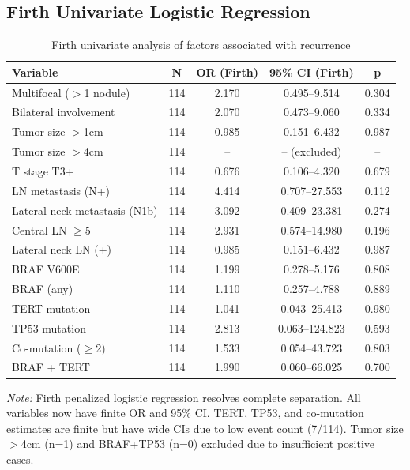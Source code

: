 \documentclass[12pt,a4paper]{article}
\begin{document}
\subsection{Firth Univariate Logistic Regression}
\begin{table}[H]
\centering
\caption{Firth univariate analysis of factors associated with recurrence}
\label{tab:uni}
\begin{tabular}{lcccc}
\toprule
Variable & N & OR (Firth) & 95\% CI (Firth) & p \\
\midrule
Multifocal ($>$1 nodule)           & 114 & 2.170 & 0.495--9.514   & 0.304 \\
Bilateral involvement         & 114 & 2.070 & 0.473--9.060   & 0.334 \\
Tumor size $>$1cm        & 114 & 0.985 & 0.151--6.432   & 0.987 \\
Tumor size $>$4cm        & 114 & --    & -- (excluded)   & --   \\
T stage T3+              & 114 & 0.676 & 0.106--4.320   & 0.679 \\
LN metastasis (N+)           & 114 & 4.414 & 0.707--27.553  & 0.112 \\
Lateral neck metastasis (N1b)  & 114 & 3.092 & 0.409--23.381  & 0.274 \\
Central LN $\geq$5    & 114 & 2.931 & 0.574--14.980  & 0.196 \\
Lateral neck LN (+)            & 114 & 0.985 & 0.151--6.432   & 0.987 \\
BRAF V600E                 & 114 & 1.199 & 0.278--5.176   & 0.808 \\
BRAF (any)              & 114 & 1.110 & 0.257--4.788   & 0.889 \\
TERT mutation              & 114 & 1.041 & 0.043--25.413  & 0.980 \\
TP53 mutation              & 114 & 2.813 & 0.063--124.823 & 0.593 \\
Co-mutation ($\geq$2)   & 114 & 1.533 & 0.054--43.723  & 0.803 \\
BRAF + TERT                & 114 & 1.990 & 0.060--66.025  & 0.700 \\
\bottomrule
\end{tabular}
\end{table}

\emph{Note:} Firth penalized logistic regression resolves complete separation. All variables now have finite OR and 95\% CI. TERT, TP53, and co-mutation estimates are finite but have wide CIs due to low event count (7/114). Tumor size $>$4cm (n=1) and BRAF+TP53 (n=0) excluded due to insufficient positive cases.
\end{document}
